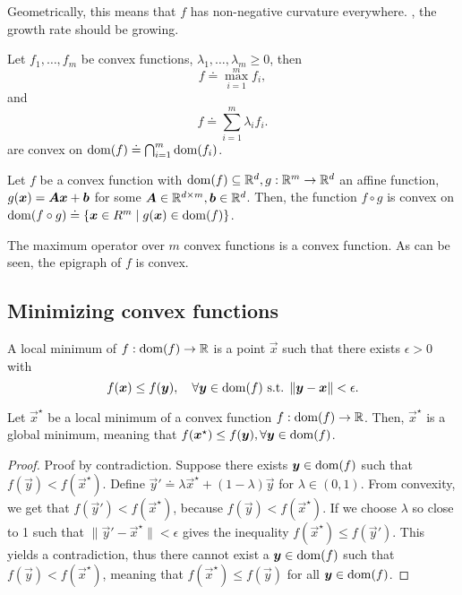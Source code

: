 Geometrically, this means that $f$ has non-negative curvature everywhere. \Ie, the growth rate
should be growing.

\begin{lemma}
    \label{lem:conv-pres}

    Let $f_1,\ldots,f_m$ be convex functions, $\lambda_1,\ldots,\lambda_m \geq 0$, then \[
        f \doteq \max_{i=1}^m f_i,
    \]
    and \[
        f \doteq \sum_{i=1}^m \lambda_i f_i.
    \]
    are convex on $\mathrm{dom}(f) \doteq \bigcap_{i=1}^m \mathrm{dom}(f_i)$.

    Let $f$ be a convex function with $\mathrm{dom}(f) \subseteq \mathbb{R}^d, g: \mathbb{R}^m \to \mathbb{R}^d$ an affine function,
    \ie $g(\bm{x}) = \bm{A}\bm{x} + \bm{b}$ for some $\bm{A}\in \mathbb{R}^{d\times m},\bm{b}\in \mathbb{R}^d$.
    Then, the function $f \circ g$ is convex on $\mathrm{dom}(f \circ g) \doteq \{ \bm{x}\in R^m \mid
        g(\bm{x}) \in \mathrm{dom}(f) \}$.
\end{lemma}

\begin{marginfigure}
    \centering
    \caption{The maximum operator over $m$ convex functions is a convex function. As can be seen, the epigraph of $f$ is convex.}
    \label{fig:max-convexity}
\end{marginfigure}

\subsection{Minimizing convex functions}

\begin{definition}
    A local minimum of $f: \mathrm{dom}(f) \to \mathbb{R}$ is a point $\vec{x}$ such that there exists $\epsilon > 0$ with \[
        f(\bm{x}) \leq f(\bm{y}), \quad \forall \bm{y} \in \mathrm{dom}(f) \text{ s.t. } \| \bm{y}-\bm{x} \| < \epsilon.
    \]
\end{definition}

\begin{lemma}
    Let $\vec{x}^\star$ be a local minimum of a convex function $f: \mathrm{dom}(f) \to \mathbb{R}$. Then,
    $\vec{x}^\star$ is a global minimum, meaning that
    $f(\bm{x}^\star) \leq f(\bm{y}), \forall \bm{y} \in \mathrm{dom}(f)$.
\end{lemma}

\begin{proof}
    Proof by contradiction. Suppose there exists $\bm{y}\in\mathrm{dom}(f)$ such that
    $f(\vec{y}) < f(\vec{x}^\star)$. Define $\vec{y}' \doteq \lambda \vec{x}^\star + (1-\lambda) \vec{y}$
    for $\lambda\in(0,1)$. From convexity, we get that $f(\vec{y}') < f(\vec{x}^\star)$, because
    $f(\vec{y}) < f(\vec{x}^\star)$. If we choose $\lambda$ so close to 1 such that
    $\| \vec{y}' - \vec{x}^\star \| < \epsilon$ gives the inequality $f(\vec{x}^\star) \leq f(\vec{y}')$.
    This yields a contradiction, thus there cannot exist a $\bm{y}\in\mathrm{dom}(f)$ such that
    $f(\vec{y}) < f(\vec{x}^\star)$, meaning that $f(\vec{x}^\star) \leq f(\vec{y})$ for all $\bm{y}\in\mathrm{dom}(f)$.
\end{proof}

